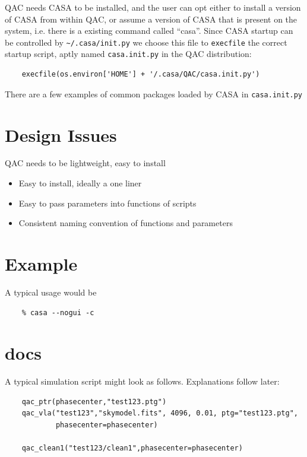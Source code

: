 \documentclass[11pt,twoside]{article}
\begin{document}
QAC needs CASA to be installed, and the user can opt either to install a version
of CASA from within QAC, or assume a version of CASA that is present on the system, i.e. there
is a existing command called ``casa''. Since CASA startup can be controlled by
\verb+~/.casa/init.py+ we choose this file to {\tt execfile} the correct startup script,
aptly named {\tt casa.init.py} in the QAC distribution:


\begin{verbatim}
    execfile(os.environ['HOME'] + '/.casa/QAC/casa.init.py')
\end{verbatim}

\noindent
There are a few examples of common packages loaded by CASA in {\tt casa.init.py}

\section{Design Issues}

QAC needs to be lightweight, easy to install

\begin{itemize}

\item
  Easy to install, ideally a one liner

\item
  Easy to pass parameters into functions of scripts

\item
  Consistent naming convention of functions and parameters
  
\end{itemize}

\section{Example}

A typical usage would be

\begin{verbatim}
    % casa --nogui -c 
\end{verbatim}


\section{docs}

A typical simulation script might look as follows. Explanations follow later:

\footnotesize
\begin{verbatim}
    qac_ptr(phasecenter,"test123.ptg")
    qac_vla("test123","skymodel.fits", 4096, 0.01, ptg="test123.ptg",
            phasecenter=phasecenter)
            
    qac_clean1("test123/clean1",phasecenter=phasecenter)
\end{verbatim}
\normalsize
\end{document}
